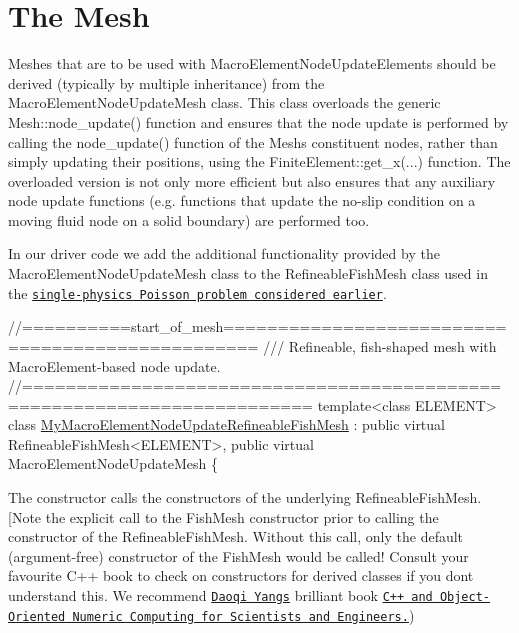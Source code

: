  

\hypertarget{index_mesh}{}\section{The Mesh}\label{index_mesh}
Meshes that are to be used with {\ttfamily Macro\+Element\+Node\+Update\+Elements} should be derived (typically by multiple inheritance) from the {\ttfamily Macro\+Element\+Node\+Update\+Mesh} class. This class overloads the generic {\ttfamily Mesh\+::node\+\_\+update()} function and ensures that the node update is performed by calling the {\ttfamily node\+\_\+update()} function of the {\ttfamily Mesh\textquotesingle{}s} constituent nodes, rather than simply updating their positions, using the {\ttfamily Finite\+Element\+::get\+\_\+x}(...) function. The overloaded version is not only more efficient but also ensures that any auxiliary node update functions (e.\+g. functions that update the no-\/slip condition on a moving fluid node on a solid boundary) are performed too.

In our driver code we add the additional functionality provided by the {\ttfamily Macro\+Element\+Node\+Update\+Mesh} class to the {\ttfamily Refineable\+Fish\+Mesh} class used in the \href{../../../poisson/fish_poisson/html/index.html}{\tt single-\/physics Poisson problem considered earlier}.


\begin{DoxyCodeInclude}
\textcolor{comment}{//==========start\_of\_mesh=================================================}
\textcolor{comment}{/// Refineable, fish-shaped mesh with MacroElement-based node update.}
\textcolor{comment}{}\textcolor{comment}{//========================================================================}
\textcolor{keyword}{template}<\textcolor{keyword}{class} ELEMENT>
\textcolor{keyword}{class }\hyperlink{classMyMacroElementNodeUpdateRefineableFishMesh}{MyMacroElementNodeUpdateRefineableFishMesh} : 
 \textcolor{keyword}{public} \textcolor{keyword}{virtual} RefineableFishMesh<ELEMENT>,
 \textcolor{keyword}{public} \textcolor{keyword}{virtual} MacroElementNodeUpdateMesh
\{

\end{DoxyCodeInclude}


The constructor calls the constructors of the underlying {\ttfamily Refineable\+Fish\+Mesh}. \mbox{[}Note the explicit call to the {\ttfamily Fish\+Mesh} constructor prior to calling the constructor of the {\ttfamily Refineable\+Fish\+Mesh}. Without this call, only the default (argument-\/free) constructor of the {\ttfamily Fish\+Mesh} would be called! Consult your favourite C++ book to check on constructors for derived classes if you don\textquotesingle{}t understand this. We recommend \href{http://www.math.wayne.edu/~yang/}{\tt Daoqi Yang\textquotesingle{}s} brilliant book \href{http://www.springeronline.com/sgw/cda/frontpage/0,11855,4-40007-22-2105335-0,00.html?changeHeader=true}{\tt C++ and Object-\/\+Oriented Numeric Computing for Scientists and Engineers.})


